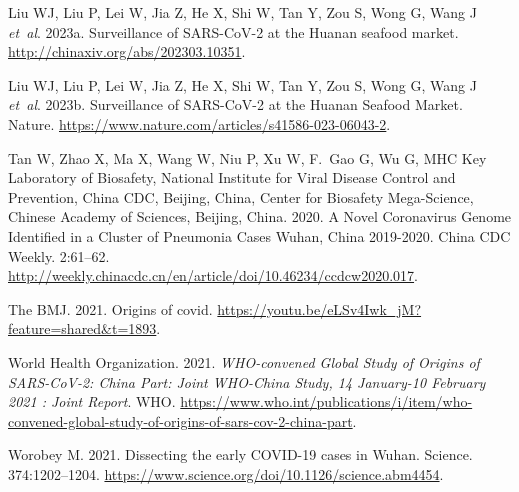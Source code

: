 \documentclass[11pt]{article}
\begin{document}
\begin{thebibliography}{24}
{Liu WJ, Liu P, Lei W, Jia Z, He X, Shi W, Tan Y, Zou S, Wong G, Wang J {\em
  et~al\/}}. 2023{a}. Surveillance of {{SARS-CoV-2}} at the {{Huanan}} seafood
  market. \url{http://chinaxiv.org/abs/202303.10351}.

{Liu WJ, Liu P, Lei W, Jia Z, He X, Shi W, Tan Y, Zou S, Wong G, Wang J {\em
  et~al\/}}. 2023{b}. Surveillance of {{SARS-CoV-2}} at the {{Huanan Seafood
  Market}}. Nature. \url{https://www.nature.com/articles/s41586-023-06043-2}.

{Tan W, Zhao X, Ma X, Wang W, Niu P, Xu W, F.~Gao G, Wu G, {MHC Key Laboratory
  of Biosafety, National Institute for Viral Disease Control and Prevention,
  China CDC, Beijing, China}, {Center for Biosafety Mega-Science, Chinese
  Academy of Sciences, Beijing, China}}. 2020. A {{Novel Coronavirus Genome
  Identified}} in a {{Cluster}} of {{Pneumonia Cases}} \textemdash{} {{Wuhan}},
  {{China}} 2019-2020. China CDC Weekly. 2:61--62.
  \url{http://weekly.chinacdc.cn/en/article/doi/10.46234/ccdcw2020.017}.

{{The BMJ}}. 2021. Origins of covid.
  \url{https://youtu.be/eLSv4Iwk_jM?feature=shared&t=1893}.

{{World Health Organization}}. 2021. {\em {{WHO-convened}} Global Study of
  Origins of {{SARS-CoV-2}}: {{China}} Part: {{Joint WHO-China}} Study, 14
  January-10 February 2021 : {{Joint}} Report\/}. WHO.
  \url{https://www.who.int/publications/i/item/who-convened-global-study-of-origins-of-sars-cov-2-china-part}.

{Worobey M}. 2021. Dissecting the early {{COVID-19}} cases in {{Wuhan}}.
  Science. 374:1202--1204.
  \url{https://www.science.org/doi/10.1126/science.abm4454}.


\end{thebibliography}
\end{document}
